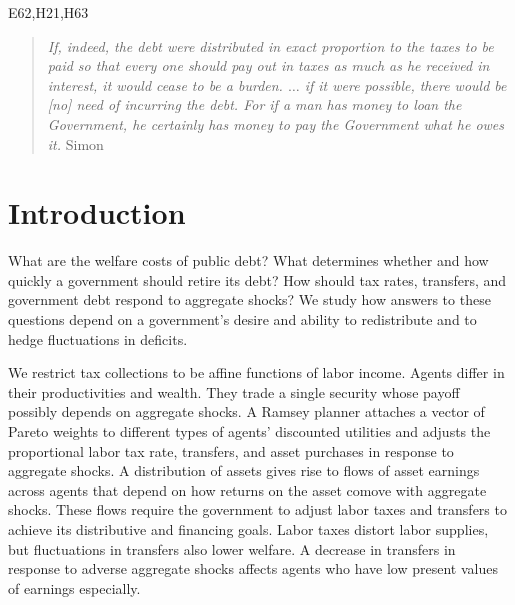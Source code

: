 \documentclass[thmsb,11pt]{article}
\begin{document}
 E62,H21,H63
\thispagestyle{empty}\bigskip

\bigskip \newpage

\setcounter{page}{1}

\bigskip \baselineskip0.65cm


%


%

 \begin{quote}
 \emph{If, indeed, the debt were distributed in exact proportion to the taxes
 to be paid so that every one should pay out in taxes as much as he received
 in interest, it would cease to be a burden.%
 $\ldots$ if it were possible, there
 would be [no] need of incurring the debt. For if a man has money to loan the
 Government, he certainly has money to pay the Government what he owes it.
 }Simon \citet[p.85]{newcomb1865critical}
 \end{quote}



\section{Introduction}
\color{black}
What are the welfare costs of public debt? What determines whether and how quickly a government should retire its debt? How should  tax rates, transfers, and government debt respond to aggregate shocks? We study how answers to these questions depend on a government's desire and ability to redistribute
and to hedge fluctuations in deficits.

We restrict tax collections to be   affine functions of labor income. Agents differ in
their productivities and wealth.  They  trade a single  security whose payoff possibly depends on aggregate shocks.
A Ramsey planner attaches  a  vector of Pareto weights to different types of agents' discounted utilities and adjusts
the proportional labor  tax rate, transfers, and asset purchases in response to aggregate shocks. A distribution of assets  gives rise to  flows of asset earnings across  agents that depend on how returns on the asset comove with aggregate shocks. These
  flows require the government  to adjust labor taxes and transfers  to achieve its distributive and financing goals. Labor taxes distort  labor supplies, but fluctuations in  transfers also lower welfare. A decrease in transfers in response to adverse aggregate shocks  affects agents who have low present values of earnings especially.
\end{document}
